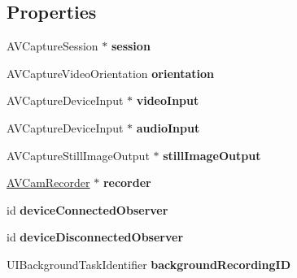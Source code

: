 \subsection*{Properties}
\begin{DoxyCompactItemize}
\item 
\hypertarget{interface_capture_manager_ac6de5be1f89333713644adb10398d701}{}A\+V\+Capture\+Session $\ast$ {\bfseries session}\label{interface_capture_manager_ac6de5be1f89333713644adb10398d701}

\item 
\hypertarget{interface_capture_manager_a89196b28420d4df27e62b92a03dc7b75}{}A\+V\+Capture\+Video\+Orientation {\bfseries orientation}\label{interface_capture_manager_a89196b28420d4df27e62b92a03dc7b75}

\item 
\hypertarget{interface_capture_manager_a904827e200742354b3872c04d5f5b2e2}{}A\+V\+Capture\+Device\+Input $\ast$ {\bfseries video\+Input}\label{interface_capture_manager_a904827e200742354b3872c04d5f5b2e2}

\item 
\hypertarget{interface_capture_manager_ad03f6746e8e2c5e3b7d0d69344e07d5b}{}A\+V\+Capture\+Device\+Input $\ast$ {\bfseries audio\+Input}\label{interface_capture_manager_ad03f6746e8e2c5e3b7d0d69344e07d5b}

\item 
\hypertarget{interface_capture_manager_ada88e03646aa62041766538332ecdcc8}{}A\+V\+Capture\+Still\+Image\+Output $\ast$ {\bfseries still\+Image\+Output}\label{interface_capture_manager_ada88e03646aa62041766538332ecdcc8}

\item 
\hypertarget{interface_capture_manager_a7b09933d58ee524eadbea29c0830be88}{}\hyperlink{interface_a_v_cam_recorder}{A\+V\+Cam\+Recorder} $\ast$ {\bfseries recorder}\label{interface_capture_manager_a7b09933d58ee524eadbea29c0830be88}

\item 
\hypertarget{interface_capture_manager_a037159dfdb7db3538db11a246e525182}{}id {\bfseries device\+Connected\+Observer}\label{interface_capture_manager_a037159dfdb7db3538db11a246e525182}

\item 
\hypertarget{interface_capture_manager_a3cb42456402244a5d55d2d235162da96}{}id {\bfseries device\+Disconnected\+Observer}\label{interface_capture_manager_a3cb42456402244a5d55d2d235162da96}

\item 
\hypertarget{interface_capture_manager_afcd4d84caa959233374cb42ffccb658f}{}U\+I\+Background\+Task\+Identifier {\bfseries background\+Recording\+I\+D}\label{interface_capture_manager_afcd4d84caa959233374cb42ffccb658f}


\end{DoxyCompactItemize}
